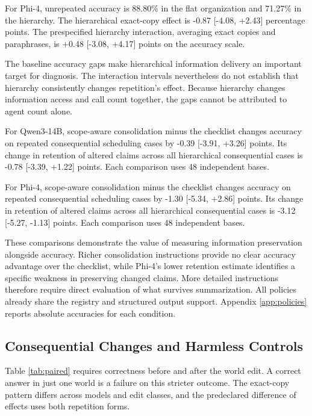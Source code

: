 \documentclass{svproc}
\begin{document}
For Phi-4, unrepeated accuracy is 88.80\% in the flat organization and 71.27\% in the hierarchy. The hierarchical exact-copy effect is -0.87 [-4.08, +2.43] percentage points. The prespecified hierarchy interaction, averaging exact copies and paraphrases, is +0.48 [-3.08, +4.17] points on the accuracy scale.

The baseline accuracy gaps make hierarchical information delivery an important
target for diagnosis. The interaction intervals nevertheless do not establish
that hierarchy consistently changes repetition's effect. Because hierarchy
changes information access and call count together, the gaps cannot be
attributed to agent count alone.

For Qwen3-14B, scope-aware consolidation minus the checklist changes accuracy on repeated consequential scheduling cases by -0.39 [-3.91, +3.26] points. Its change in retention of altered claims across all hierarchical consequential cases is -0.78 [-3.39, +1.22] points. Each comparison uses 48 independent bases.

For Phi-4, scope-aware consolidation minus the checklist changes accuracy on repeated consequential scheduling cases by -1.30 [-5.34, +2.86] points. Its change in retention of altered claims across all hierarchical consequential cases is -3.12 [-5.27, -1.13] points. Each comparison uses 48 independent bases.

These comparisons demonstrate the value of measuring information preservation
alongside accuracy. Richer consolidation instructions provide no clear accuracy
advantage over the checklist, while Phi-4's lower retention estimate identifies
a specific weakness in preserving changed claims. More detailed instructions
therefore require direct evaluation of what survives summarization.
All policies already share the registry and structured output support.
Appendix \ref{app:policies} reports absolute accuracies for each condition.





\subsection{Consequential Changes and Harmless Controls}
Table \ref{tab:paired} requires correctness before and after the world edit.
A correct answer in just one world is a failure on this stricter outcome.
The exact-copy pattern differs across models and edit classes, and the
predeclared difference of effects uses both repetition forms.
\end{document}
